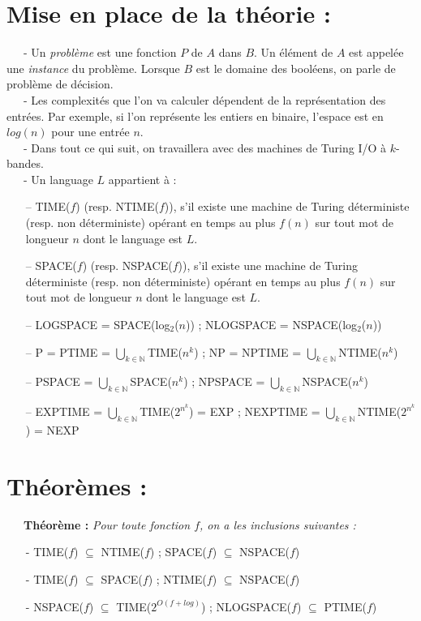 \documentclass[10pt,a4paper]{article}
\begin{document}
 



\section{Mise en place de la théorie :}

\ \ \ - Un \textit{problème} est une fonction $P$ de $A$ dans $B$. Un élément de $A$ est appelée
une \textit{instance} du problème. Lorsque $B$ est le domaine des booléens, on parle de
problème de décision. \\

\ \ \ - Les complexités que l'on va calculer dépendent de la représentation des entrées. Par exemple, si l'on représente les entiers en binaire, l'espace est en $log(n)$ pour une entrée $n$. \\

\ \ \ - Dans tout ce qui suit, on travaillera avec des machines de Turing I/O à $k$-bandes. \\

\ \ \ - Un language $L$ appartient à : 
\begin{enumerate}
\item[--] TIME($f$) (resp. NTIME($f$)), s'il existe une machine de Turing déterministe (resp. non déterministe) opérant en temps au plus $f(n)$ sur tout mot de longueur $n$ dont le language est $L$.
\item[--] SPACE($f$) (resp. NSPACE($f$)), s'il existe une machine de Turing déterministe (resp. non déterministe) opérant en temps au plus $f(n)$ sur tout mot de longueur $n$ dont le language est $L$.
\item[--] LOGSPACE = SPACE(log$_2$($n$)) ; NLOGSPACE = NSPACE(log$_2$($n$)) 
\item[--] P = PTIME = $\bigcup_{k \in \mathbb{N}}$TIME($n^k$) ; NP = NPTIME = $\bigcup_{k \in \mathbb{N}}$NTIME($n^k$)  
\item[--] PSPACE =  $\bigcup_{k \in \mathbb{N}}$SPACE($n^k$) ; NPSPACE = $\bigcup_{k \in \mathbb{N}}$NSPACE($n^k$)
\item[--] EXPTIME = $\bigcup_{k \in \mathbb{N}}$TIME($2^{n^k}$) = EXP ; NEXPTIME = $\bigcup_{k \in \mathbb{N}}$NTIME($2^{n^k}$) = NEXP 
\end{enumerate}



\section{Théorèmes :}
\ \ \ \textbf{Théorème : }\textit{Pour toute fonction $f$, on a les inclusions suivantes :}
\begin{enumerate}
\item[-] TIME($f$) $\subseteq$ NTIME($f$) ; SPACE($f$) $\subseteq$ NSPACE($f$)
\item[-] TIME($f$) $\subseteq$ SPACE($f$) ; NTIME($f$) $\subseteq$ NSPACE($f$)
\item[-] NSPACE($f$) $\subseteq$ TIME($2^{O(f+log)}$) ; NLOGSPACE($f$) $\subseteq$ PTIME($f$)
\end{enumerate}
\end{document}
